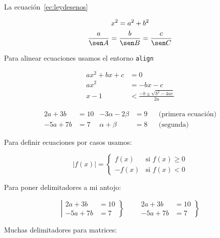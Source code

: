 La ecuación~\ref{ec:leydesenos}

\begin{equation}
\begin{gathered}
  x^2 = a^2 + b^2 \\
  \frac{a}{\sen A} =\frac{b}{\sen B} = \frac{c}{\sen C} 
\end{gathered}
\end{equation}

Para alinear ecuaciones usamos el entorno \texttt{align}

\begin{align}
  ax^2 + bx + c &= 0\\
  ax^2 &= -bx -c\\
  x -1 &< \frac{-b \pm\sqrt{b^2 - 4ac}}{2a}
\end{align}

\begin{align*}
  2a + 3b &= 10 & -3\alpha - 2\beta &= 9 & &\text{(primera ecuación)}\\
  -5a + 7b &= 7 & \alpha + \beta &= 8 & &\text{(segunda)}
\end{align*}

Para definir ecuaciones por casos usamos:

\begin{equation*}
  |f(x)| = \begin{cases}
    f(x) & \text{si $f(x) \geq 0$}\\
    -f(x) & \text{si $f(x) < 0$}
  \end{cases}
\end{equation*}

Para poner delimitadores a mi antojo:

\begin{equation*}
  \left|\begin{aligned}
    2a+3b &= 10\\
    -5a+7b &= 7
  \end{aligned}\right\} \qquad
  \left.\begin{aligned}
    2a+3b &= 10\\
    -5a+7b &= 7
  \end{aligned}\right\}
\end{equation*}

Muchas delimitadores para matrices:

